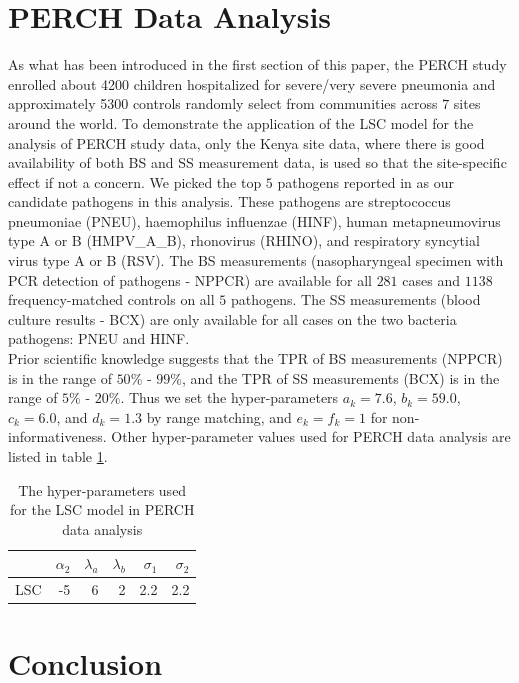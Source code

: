 \documentclass[11 pt, a4paper]{article}  %
\begin{document}
\section{PERCH Data Analysis}
As what has been introduced in the first section of this paper, the PERCH study enrolled about 4200 children hospitalized for severe/very severe pneumonia and approximately 5300 controls randomly select from communities across $7$ sites around the world. To demonstrate the application of the LSC model for the analysis of PERCH study data, only the Kenya site data, where there is good availability of both BS and SS measurement data, is used so that the site-specific effect if not a concern. We picked the top $5$ pathogens reported in \cite{wu2015partially} as our candidate pathogens in this analysis. These pathogens are streptococcus pneumoniae (PNEU), haemophilus influenzae (HINF), human metapneumovirus type A or B (HMPV\_A\_B), rhonovirus (RHINO), and respiratory syncytial virus type A or B (RSV). The BS measurements (nasopharyngeal specimen with PCR detection of pathogens - NPPCR) are available for all $281$ cases and $1138$ frequency-matched controls on all $5$ pathogens. The SS measurements (blood culture results - BCX) are only available for all cases on the two bacteria pathogens: PNEU and HINF.\\

Prior scientific knowledge \cite{murdoch2012laboratory} suggests that the TPR of BS measurements (NPPCR) is in the range of $50$\% - $99$\%, and the TPR of SS measurements (BCX) is in the range of $5$\% - $20$\%. Thus we set the hyper-parameters $a_k = 7.6$, $b_k = 59.0$, $c_k = 6.0$, and $d_k = 1.3$ by range matching, and $e_k = f_k = 1$ for non-informativeness. Other hyper-parameter values used for PERCH data analysis are listed in table \ref{tab:perchhyper}. 

\begin{table}[h]
\centering
\caption{The hyper-parameters used for the LSC model in PERCH data analysis}
\label{tab:perchhyper}
\begin{tabular}{lrrrrr}
\hline
        & $\alpha_2$ & $\lambda_a$ & $\lambda_b$ & $\sigma_1$  & $\sigma_2$    \\ \hline
LSC     & -5 & 6  & 2 & 2.2 & 2.2 \\ \hline
\end{tabular}
\end{table}





\section{Conclusion}
\end{document}
